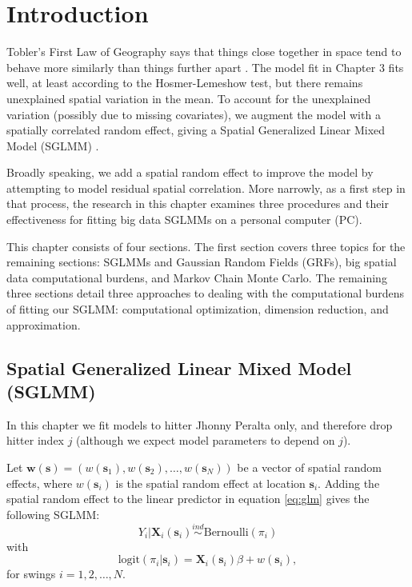 \section{Introduction} %

Tobler's First Law of Geography says that things close together in space tend to behave more similarly than things further apart \citep{Tobler1970}. The model fit in Chapter 3 fits well, at least according to the Hosmer-Lemeshow test, but there remains unexplained spatial variation in the mean. To account for the unexplained variation (possibly due to missing covariates), we augment the model with a spatially correlated random effect, giving a Spatial Generalized Linear Mixed Model (SGLMM) \citep{Banerjee2008}.

Broadly speaking, we add a spatial random effect to improve the model by attempting to model residual spatial correlation. More narrowly, as a first step in that process, the research in this chapter examines three procedures and their effectiveness for fitting big data SGLMMs on a personal computer (PC).

This chapter consists of four sections. The first section covers three topics for the remaining sections:  SGLMMs and Gaussian Random Fields (GRFs), big spatial data computational burdens, and Markov Chain Monte Carlo. The remaining three sections detail three approaches to dealing with the computational burdens of fitting our SGLMM: computational optimization, dimension reduction, and approximation.

\subsection{Spatial Generalized Linear Mixed Model (SGLMM)} %

In this chapter we fit models to hitter Jhonny Peralta only, and therefore drop hitter index $j$ (although we expect model parameters to depend on $j$). 

Let $\pmb{w}(\pmb{s}) = (w(\pmb{s}_{1}), w(\pmb{s}_{2}), \dots, w(\pmb{s}_{N}))$  be a vector of spatial random effects, where $w(\pmb{s}_{i})$ is the spatial random effect at location $\pmb{s}_{i}$. Adding the spatial random effect to the linear predictor in equation \ref{eq:glm} gives the following SGLMM:
\begin{equation} \label{eq:SGLMM}
Y_{i}|\mathbf{X}_{i}(\mathbf{s}_{i}) \stackrel{ind}{\sim} \mbox{Bernoulli}(\pi_{i}) 
\end{equation}
with
\begin{equation} \text{logit}(\pi_{i}|\pmb{s}_{i}) = \mathbf{X}_{i}(\mathbf{s}_{i})\beta + w(\pmb{s}_{i}),
\end{equation}
for swings $i = 1, 2, \dots, N$.

